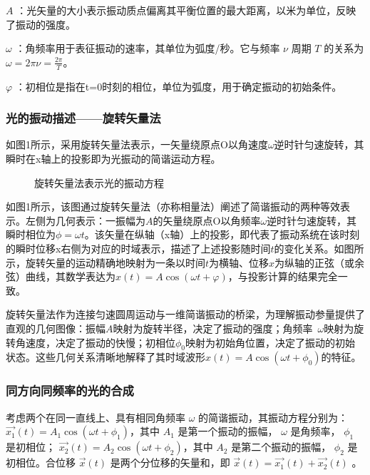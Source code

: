 \documentclass[withoutpreface,bwprint]{cumcmthesis} %
\begin{document}
\(A\) ：光矢量的大小表示振动质点偏离其平衡位置的最大距离，以米为单位，反映了振动的强度。

\(\omega\) ：角频率用于表征振动的速率，其单位为弧度/秒。它与频率 \(\nu\) 周期 \(T\) 的关系为 \(\omega = 2\pi\nu = \frac{2\pi}{T}\)。

\(\varphi\) ：初相位是指在t=0时刻的相位，单位为弧度，用于确定振动的初始条件。

\subsubsection{光的振动描述——旋转矢量法}
如图1所示，采用旋转矢量法表示，一矢量绕原点O以角速度$\omega$逆时针匀速旋转，其瞬时在x轴上的投影即为光振动的简谐运动方程。

\begin{figure}[ht]
    \centering
    \fbox{\rule{2cm}{0pt} \rule{0pt}{2cm}} %
    \caption{旋转矢量法表示光的振动方程}
    \label{fig:1}
\end{figure}

如图1所示，该图通过旋转矢量法（亦称相量法）阐述了简谐振动的两种等效表示。左侧为几何表示：一振幅为$A$的矢量绕原点O以角频率$\omega$逆时针匀速旋转，其瞬时相位为$\phi=\omega t$。该矢量在纵轴（x轴）上的投影，即代表了振动系统在该时刻的瞬时位移x右侧为对应的时域表示，描述了上述投影随时间$t$的变化关系。如图所示，旋转矢量的运动精确地映射为一条以时间$t$为横轴、位移$x$为纵轴的正弦（或余弦）曲线，其数学表达为$x(t)=A\cos(\omega t+\varphi)$，与投影计算的结果完全一致。

旋转矢量法作为连接匀速圆周运动与一维简谐振动的桥梁，为理解振动参量提供了直观的几何图像：振幅$A$映射为旋转半径，决定了振动的强度；角频率 $\omega$映射为旋转角速度，决定了振动的快慢；初相位$\phi_0$映射为初始角位置，决定了振动的初始状态。这些几何关系清晰地解释了其时域波形$x(t)=A\cos(\omega t+\phi_0)$的特征。

\subsubsection{同方向同频率的光的合成}
考虑两个在同一直线上、具有相同角频率 $\omega$ 的简谐振动，其振动方程分别为：
$ \overrightarrow{x_1}(t) = A_1 \cos(\omega t + \phi_{1})$，其中 $A_1$ 是第一个振动的振幅， $\omega$ 是角频率， $\phi_{1}$ 是初相位；
$\overrightarrow{x_2}(t) = A_2 \cos(\omega t + \phi_{2})$，其中 $A_2$ 是第二个振动的振幅， $\phi_{2}$ 是初相位。合位移 $\overrightarrow{x}(t)$ 是两个分位移的矢量和，即 $\overrightarrow{x}(t) = \overrightarrow{x_1}(t) + \overrightarrow{x_2}(t)$ 。
\end{document}
